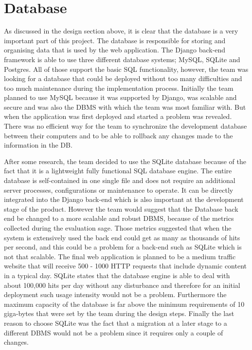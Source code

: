 \documentclass{l3proj}
\begin{document}
\section{Database}
\par As discussed in the design section above, it is clear that the database is a very important part of this project. The database is responsible for storing and organising data that is used by the web application. The Django back-end framework is able to use three different database systems; MySQL, SQLite and Postgres. All of those support the basic SQL functionality, however, the team was looking for a database that could be deployed without too many difficulties and too much maintenance during the implementation process. Initially the team planned to use MySQL because it was supported by Django, was scalable and secure and was also the DBMS with which the team was most familiar with. But when the application was first deployed and started a problem was revealed. There was no efficient way for the team to synchronize the development database between their computers and to be able to rollback any changes made to the information in the DB.\\
\par After some research, the team decided to use the SQLite database because of the fact that it is a lightweight fully functional SQL database engine. The entire database is self-contained in one single file and does not require an additional server processes, configurations or maintenance to operate. It can be directly integrated into the Django back-end which is also important at the development stage of the product. However the team would suggest that the Database back end be changed to a more scalable and robust DBMS, because of the metrics collected during the evaluation sage. Those metrics suggested that when the system is extensively used the back end could get as many as thousands of hits per second, and this could be a problem for a back-end such as SQLite which is not that scalable. The final web application is planned to be a medium traffic website that will receive 500 - 1000 HTTP requests that include dynamic content in a typical day. SQLite states that the database engine is able to deal with about 100,000 hits per day without any disturbance and therefore for an initial deployment such usage intensity would not be a problem. Furthermore the maximum capacity of the database is far above the minimum requirements of 10 giga-bytes that were set by the team during the design steps. Finally the last reason to choose SQLite was the fact that a migration at a later stage to a different DBMS would not be a problem since it requires only a couple of changes.\\
\end{document}
